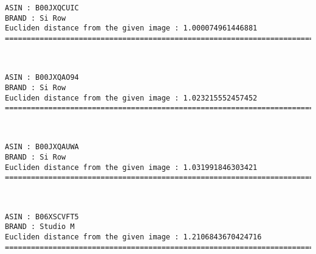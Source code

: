 \documentclass[11pt]{article}
\begin{document}
    \begin{Verbatim}[commandchars=\\\{\}]
ASIN : B00JXQCUIC
BRAND : Si Row
Eucliden distance from the given image : 1.000074961446881
=============================================================================================================================

    \end{Verbatim}

    \begin{center}
    \end{center}
    { \hspace*{\fill} \\}
    
    \begin{Verbatim}[commandchars=\\\{\}]
ASIN : B00JXQAO94
BRAND : Si Row
Eucliden distance from the given image : 1.023215552457452
=============================================================================================================================

    \end{Verbatim}

    \begin{center}
    \end{center}
    { \hspace*{\fill} \\}
    
    \begin{Verbatim}[commandchars=\\\{\}]
ASIN : B00JXQAUWA
BRAND : Si Row
Eucliden distance from the given image : 1.031991846303421
=============================================================================================================================

    \end{Verbatim}

    \begin{center}
    \end{center}
    { \hspace*{\fill} \\}
    
    \begin{Verbatim}[commandchars=\\\{\}]
ASIN : B06XSCVFT5
BRAND : Studio M
Eucliden distance from the given image : 1.2106843670424716
=============================================================================================================================

    \end{Verbatim}
\end{document}
